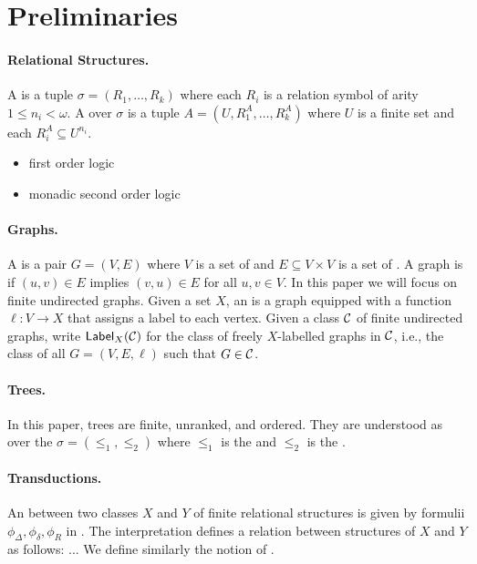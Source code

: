 \section{Preliminaries}
\label{sec:preliminaries}

\paragraph*{Relational Structures.} A  is a tuple
$\sigma = (R_1, \ldots, R_k)$ where each $R_i$ is a relation symbol of arity $1
\leq n_i < \omega$. A  over $\sigma$ is a tuple $A
= (U, R_1^A, \ldots, R_k^A)$ where $U$ is a finite set and each $R_i^A
\subseteq U^{n_i}$.

\begin{itemize}
    \item first order logic 
    \item monadic second order logic
\end{itemize}

\paragraph*{Graphs.} A  is a pair $G = (V, E)$ where $V$ is a set
of  and $E \subseteq V \times V$ is a set of . A
graph is  if $(u, v) \in E$ implies $(v, u) \in E$ for all
$u, v \in V$. In this paper we will focus on finite undirected graphs. Given a
set $X$, an  is a graph equipped with a function
$\ell \colon V \to X$ that assigns a label to each vertex. Given a class $\mathcal{C}$
of finite undirected graphs, write $\mathsf{Label}_{X}(\mathcal{C})$ for the class of freely
$X$-labelled graphs in $\mathcal{C}$, i.e., the class of all 
$G = (V, E, \ell)$ such that $G \in \mathcal{C}$.

\paragraph*{Trees.} In this paper, trees are finite, unranked, and ordered.
They are understood as  over the 
$\sigma = (\leq_1, \leq_2)$ where $\leq_1$ is the  and
$\leq_2$ is the .

\paragraph*{Transductions.} An  between two
classes $X$ and $Y$ of finite relational structures is given by formulii
$\phi_{\Delta}, \phi_{\delta}, \phi_{R}$ in .
The interpretation defines a relation between structures of $X$ and $Y$ as
follows: ... We define similarly the notion of .

